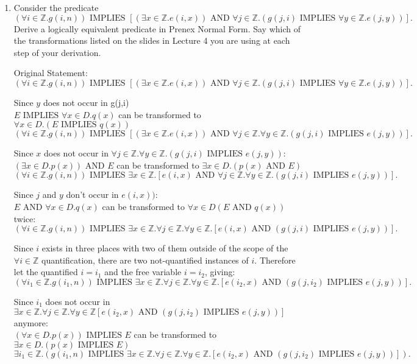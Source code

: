 \documentclass[11pt]{article}
\def\ints {{\mathbb Z}}
\newcommand{\Implies}{\mbox{ IMPLIES }}
\newcommand{\And}{\mbox{ AND }}
\begin{document}
\begin{enumerate}
\item
\begin{question}
Consider the predicate
$$(\forall i \in \ints. g(i,n)) \Implies \left[ (\exists x\in \ints. e(i,x))  \And
\forall j \in \ints. (g(j,i) \Implies \forall y\in \ints. e(j,y))
\right].$$
Derive a logically equivalent predicate in Prenex Normal Form.
Say which of the transformations listed on the slides in Lecture 4 you are using at
each step of your derivation.\\
\end{question}
\begin{solution}
Original Statement:
$$(\forall i \in \ints. g(i,n)) \Implies \left[ (\exists x\in \ints. e(i,x))  \And
\forall j \in \ints. (g(j,i) \Implies \forall y\in \ints. e(j,y))
\right].$$

Since $y$ does not occur in g(j,i) \\
$E \Implies \forall x \in D.q(x)$ can be transformed to $\forall x \in D.(E \Implies q(x))$
$$(\forall i \in \ints. g(i,n)) \Implies \left[ (\exists x\in \ints. e(i,x))  \And
\forall j \in \ints.\forall y\in \ints. (g(j,i) \Implies  e(j,y))
\right].$$

Since $x$ does not occur in $\forall j \in \ints.\forall y\in \ints. (g(j,i) \Implies  e(j,y))$: \\
$(\exists x\in D.p(x))\And E$ can be transformed to $\exists x\in D.(p(x)\And E)$
$$(\forall i \in \ints. g(i,n)) \Implies\exists x\in \ints.\left[e(i,x)  \And
 \forall j \in \ints.\forall y\in \ints. (g(j,i) \Implies  e(j,y))
\right].$$

Since $j$ and $y$ don't occur in $e(i,x))$: \\
$E \And \forall x\in D.q(x)$ can be transformed to $\forall x\in D(E \And q(x))$ twice:
$$(\forall i \in \ints. g(i,n)) \Implies \exists x\in \ints. \forall j \in \ints.\forall y\in \ints. \left[e(i,x)  \And
 (g(j,i) \Implies  e(j,y))
\right].$$

Since $i$ exists in three places with two of them outside of the scope of the $\forall i\in\ints$ quantification, there are two not-quantified instances of $i$. Therefore let the quantified $i= i_1$ and the free variable $i=i_2$, giving:\\
$$(\forall i_1 \in \ints. g(i_1,n)) \Implies \exists x\in \ints.\forall j \in \ints.\forall y\in \ints.\left[e(i_2,x)  \And
 (g(j,i_2) \Implies  e(j,y))
\right].$$

Since $i_1$ does not occur in $\exists x\in \ints.\forall j \in\ints.\forall y\in \ints \left[ e(i_2,x)  \And (g(j,i_2) \Implies  e(j,y))\right]$ anymore:\\
$(\forall x\in D.p(x)) \Implies E$ can be transformed to $\exists x\in D.(p(x)\Implies E)$
$$\exists i_1 \in \ints. (g(i_1,n) \Implies \exists x\in \ints.\forall j \in \ints.\forall y\in \ints.\left[e(i_2,x)  \And
 (g(j,i_2) \Implies  e(j,y))
\right]).$$


\end{solution}
\end{enumerate}
\end{document}
